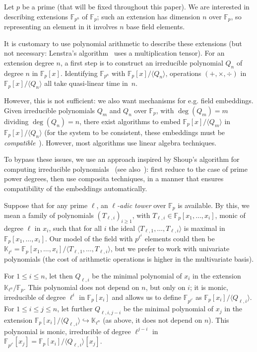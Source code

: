 \documentclass{sig-alternate}
\def\F {\ensuremath{\mathbb{F}}}
\def\K {\ensuremath{\mathbb{K}}}
\newcounter{algo}
\newcommand{\ang}[1]{\langle#1\rangle}
\begin{document}
Let $p$ be a prime (that will be fixed throughout this paper). We are
interested in describing extensions $\F_{p^n}$ of $\F_p$; such an
extension has dimension $n$ over $\F_p$, so representing an element in
it involves $n$ base field elements.

It is customary to use polynomial arithmetic to describe these
extensions (but not necessary: Lenstra's algorithm~\cite{LenstraJr91}
uses a multiplication tensor). For an extension degree $n$, a
first step is to construct an irreducible polynomial $Q_n$ of degree
$n$ in $\F_p[x]$. Identifying $\F_{p^n}$ with $\F_p[x]/\ang{Q_n}$,
operations $(+,\times,\div)$ in $\F_p[x]/\ang{Q_n}$ all take
quasi-linear time in~$n$.

However, this is not sufficient: we also want mechanisms for
e.g. field embeddings. Given irreducible polynomials $Q_m$ and $Q_n$
over $\F_p$, with $\deg(Q_m)=m$ dividing $\deg(Q_n)=n$, there exist
algorithms to embed $\F_p[x]/\ang{Q_m}$ in 
$\F_p[x]/\ang{Q_n}$ (for the system to be consistent, these embeddings
must be {\em compatible}~\cite{bosma+cannon+steel97}). However, most
algorithms use linear algebra techniques.

To bypass these issues, we use an approach inspired by Shoup's
algorithm for computing irreducible polynomials~\cite{Shoup90,shoup94}
(see also~\cite{couveignes+lercier11,lenstra+desmit08-stdmodels}):
first reduce to the case of prime power degrees, then use composita
techniques, in a manner that ensures compatibility of the embeddings
automatically.

\smallskip{}
Suppose that for any prime $\ell$, an {\em $\ell$-adic tower} over
$\F_p$ is available. By this, we mean a family of polynomials
$(T_{\ell,i})_{i \ge 1}$, with $T_{\ell,i} \in \F_p[x_1,\dots,x_i]$,
monic of degree $\ell$ in $x_i$, such that for all $i$ the ideal
$\ang{T_{\ell,1},\dots,T_{\ell,i}}$ is maximal in $\F_p[x_1,\dots,x_i]$.
Our model of the field with $p^{\ell^i}$ elements could then
be
$\K_{\ell^i}=\F_p[x_1,\dots,x_i]/\ang{T_{\ell,1},\dots,T_{\ell,i}}$,
but we prefer to work with univariate polynomials (the cost of
arithmetic operations is higher in the multivariate basis).  

For $1 \le i \le n$, let then $Q_{\ell,i}$ be the minimal polynomial
of $x_i$ in the extension $\K_{\ell^n}/\F_p$. This polynomial does
not depend on $n$, but only on $i$; it is monic, irreducible of degree
$\ell^i$ in $\F_p[x_i]$ and allows us to define $\F_{p^{\ell^i}}$ as
$\F_p[x_i]/\ang{Q_{\ell,i}}$.
For $1 \le i \le j \le n$, let further $Q_{\ell,i,j-i}$ be the minimal
polynomial of $x_j$ in the extension $\F_p[x_i]/\ang{Q_{\ell,i}} \hookrightarrow
\K_{\ell^n}$ (as above, it does not depend on $n$). This polynomial is
monic, irreducible of degree $\ell^{j-i}$ in
$\F_{p^{\ell^i}}[x_j]=\F_p[x_i]/\ang{Q_{\ell,i}}[x_j]$.
\end{document}
